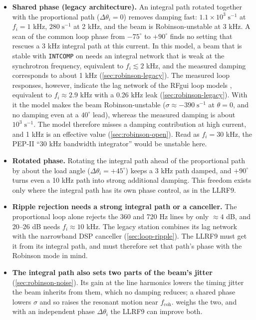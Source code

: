 \begin{itemize}
\item \textbf{Shared phase (legacy architecture).} An integral path rotated together with the proportional path (\(\Delta\theta_i = 0\)) removes damping fast: \(1.1\times10^3\;\text{s}^{-1}\) at \(f_i = 1\) kHz, \(280\;\text{s}^{-1}\) at 2 kHz, and the beam is Robinson-unstable at 3 kHz. A scan of the common loop phase from \(-75^\circ\) to \(+90^\circ\) finds no setting that rescues a 3 kHz integral path at this current. In this model, a beam that is stable with \texttt{INTCOMP} on needs an integral network that is weak at the synchrotron frequency, equivalent to \(f_i \lesssim 2\) kHz, and the measured damping corresponds to about 1 kHz (\cref{sec:robinson-legacy}). The measured loop responses, however, indicate the lag network of the RFgui loop models , equivalent to \(f_i \approx 2.9\) kHz with a 0.26 kHz leak (\cref{sec:robinson-legacy}). With it the model makes the beam Robinson-unstable (\(\sigma \approx -390\;\text{s}^{-1}\) at \(\theta = 0\), and no damping even at a \(40^\circ\) lead), whereas the measured damping is about \(10^3\;\text{s}^{-1}\). The model therefore misses a damping contribution at high current, and 1 kHz is an effective value (\cref{sec:robinson-open}). Read as \(f_i = 30\) kHz, the PEP-II ``30 kHz bandwidth integrator''  would be unstable here.
\item \textbf{Rotated phase.} Rotating the integral path ahead of the proportional path by about the load angle (\(\Delta\theta_i = +45^\circ\)) keeps a 3 kHz path damped, and \(+90^\circ\) turns even a 10 kHz path into strong additional damping. This freedom exists only where the integral path has its own phase control, as in the LLRF9.
\item \textbf{Ripple rejection needs a strong integral path or a canceller.} The proportional loop alone rejects the 360 and 720 Hz lines by only \(\approx 4\) dB, and 20--26 dB needs \(f_i \approx 10\) kHz. The legacy station combines its lag network with the narrowband DSP canceller (\cref{sec:loop-ripple}). The LLRF9 must get it from its integral path, and must therefore set that path's phase with the Robinson mode in mind.
\item \textbf{The integral path also sets two parts of the beam's jitter} (\cref{sec:robinson-noise}). Its gain at the line harmonics lowers the timing jitter the beam inherits from them, which no damping reduces; a shared phase lowers \(\sigma\) and so raises the resonant motion near \(f_\text{coh}\).  weighs the two, and with an independent phase \(\Delta\theta_i\) the LLRF9 can improve both.
\end{itemize}

